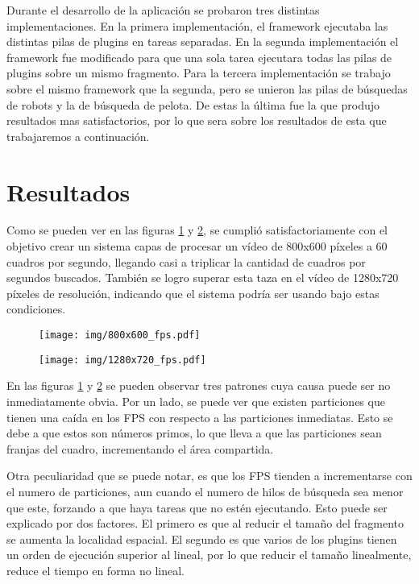 Durante el desarrollo de la aplicación se probaron tres distintas
implementaciones. En la primera implementación, el framework ejecutaba las
distintas pilas de plugins en tareas separadas. En la segunda implementación el
framework fue modificado para que una sola tarea ejecutara todas las pilas de
plugins sobre un mismo fragmento. Para la tercera implementación se trabajo
sobre el mismo framework que la segunda, pero se unieron las pilas de búsquedas
de robots y la de búsqueda de pelota. De estas la última fue la que produjo
resultados mas satisfactorios, por lo que sera sobre los resultados de esta que
trabajaremos a continuación.

\section{Resultados}

Como se pueden ver en las figuras \ref{800fps} y \ref{1280fps}, se cumplió
satisfactoriamente con el objetivo crear un sistema capas de procesar un vídeo
de 800x600 píxeles a 60 cuadros por segundo, llegando casi a triplicar la
cantidad de cuadros por segundos buscados. También se logro superar esta taza en
el vídeo de 1280x720 píxeles de resolución, indicando que el sistema podría ser
usando bajo estas condiciones.

\begin{figure}[h]

	\texttt{[image: img/800x600\_fps.pdf]}
	\caption{}
	\label{800fps}

\end{figure}

\begin{figure}[h]

	\texttt{[image: img/1280x720\_fps.pdf]}
	\caption{}
	\label{1280fps}

\end{figure}

En las figuras \ref{800fps} y \ref{1280fps} se pueden observar tres patrones
cuya causa puede ser no inmediatamente obvia. Por un lado, se puede ver que
existen particiones que tienen una caída en los FPS con respecto a las
particiones inmediatas. Esto se debe a que estos son números primos, lo que
lleva a que las particiones sean franjas del cuadro, incrementando el área
compartida.

Otra peculiaridad que se puede notar, es que los FPS tienden a incrementarse con
el numero de particiones, aun cuando el numero de hilos de búsqueda sea menor
que este, forzando a que haya tareas que no estén ejecutando. Esto puede ser
explicado por dos factores. El primero es que al reducir el tamaño del fragmento
se aumenta la localidad espacial. El segundo es que varios de los plugins tienen
un orden de ejecución superior al lineal, por lo que reducir el tamaño
linealmente, reduce el tiempo en forma no lineal.

